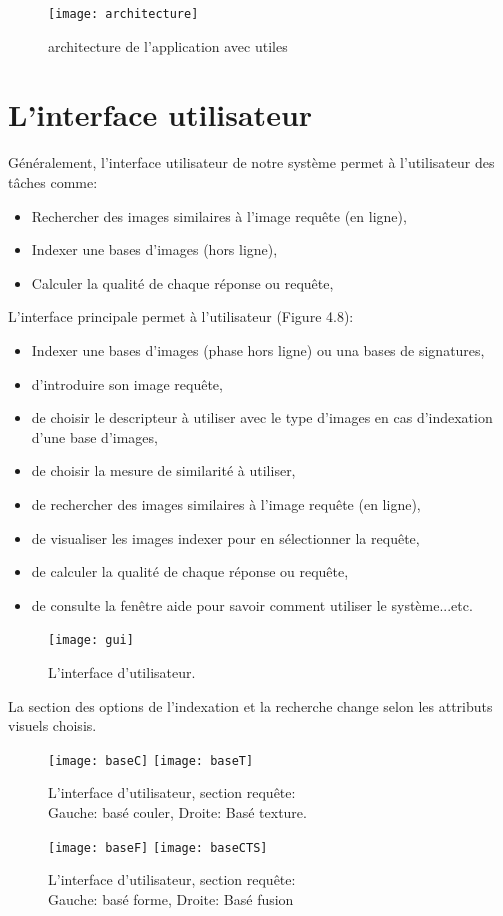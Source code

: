 \begin{figure}[H]
	\centering
	\texttt{[image: architecture]} 
	\caption{architecture de l’application avec utiles}
\end{figure}
\section{L’interface utilisateur }
Généralement, l'interface utilisateur de notre système permet à l'utilisateur des tâches comme:
 \begin{itemize}
 	\item Rechercher des images similaires à l'image requête (en ligne),
 	\item Indexer une bases d'images (hors ligne),
 	\item Calculer la qualité de chaque réponse ou requête,
 \end{itemize}

L'interface principale permet à l’utilisateur (Figure 4.8): 
\begin{itemize}
	\item Indexer une bases d'images (phase hors ligne) ou una bases de signatures,
	\item d’introduire son image requête,
	\item de choisir le descripteur à utiliser avec le type d'images en cas d'indexation d'une base d'images,
	\item de choisir la mesure de similarité à utiliser,
	\item de rechercher des images similaires à l'image requête (en ligne),
	\item de visualiser les images indexer pour en sélectionner la requête,
	\item de calculer la qualité de chaque réponse ou requête,
	\item de consulte la fenêtre aide pour savoir comment utiliser le système...etc.
\end{itemize}

\begin{figure}[H]
	\centering
	\texttt{[image: gui]} 
	\caption{L'interface d’utilisateur.}
\end{figure}

La section des options de l'indexation et la recherche change selon les attributs visuels choisis.

\begin{figure}[H]
	\texttt{[image: baseC]} \space
	\texttt{[image: baseT]} 
	\caption{L'interface d’utilisateur, section requête: \\
	Gauche: basé couler, Droite: Basé texture.}
\end{figure}
\begin{figure}[H]
	\texttt{[image: baseF]} \space
	\texttt{[image: baseCTS]} 
	\caption{L'interface d’utilisateur, section requête: \\
		Gauche: basé forme, Droite: Basé fusion}
\end{figure}


